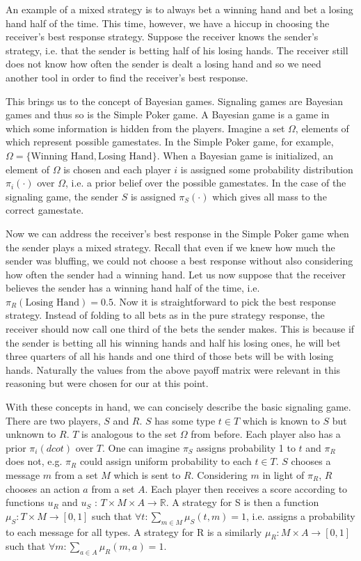 \documentclass{article}
\begin{document}
An example of a mixed strategy is to always bet a winning hand and bet a losing hand half of the time. This time, however, we have a hiccup in choosing the receiver's best response strategy. Suppose the receiver knows the sender's strategy, i.e. that the sender is betting half of his losing hands. The receiver still does not know how often the sender is dealt a losing hand and so we need another tool in order to find the receiver's best response.

This brings us to the concept of Bayesian games. Signaling games are Bayesian games and thus so is the Simple Poker game. A Bayesian game is a game in which some information is hidden from the players. Imagine a set $\Omega$, elements of which represent possible gamestates. In the Simple Poker game, for example, $\Omega = \{\text{Winning Hand}, \text{Losing Hand}\}$. When a Bayesian game is initialized, an element of $\Omega$ is chosen and each player $i$ is assigned some probability distribution $\pi_{i}(\cdot)$ over $\Omega$, i.e. a prior belief over the possible gamestates. In the case of the signaling game, the sender $S$ is assigned $\pi_S(\cdot)$ which gives all mass to the correct gamestate.

Now we can address the receiver's best response in the Simple Poker game when the sender plays a mixed strategy. Recall that even if we knew how much the sender was bluffing, we could not choose a best response without also considering how often the sender had a winning hand. Let us now suppose that the receiver believes the sender has a winning hand half of the time, i.e. $\pi_R(\text{Losing Hand}) = 0.5$. Now it is straightforward to pick the best response strategy. Instead of folding to all bets as in the pure strategy response, the receiver should now call one third of the bets the sender makes. This is because if the sender is betting all his winning hands and half his losing ones, he will bet three quarters of all his hands and one third of those bets will be with losing hands. Naturally the values from the above payoff matrix were relevant in this reasoning but were chosen for our  at this point.

With these concepts in hand, we can concisely describe the basic signaling game. There are two players, $S$ and $R$. $S$ has some type $t \in T$ which is known to $S$ but unknown to $R$. $T$ is analogous to the set $\Omega$ from before. Each player also has a prior $ \pi_i(dcot)$ over $T$. One can imagine $\pi_{S}$ assigns probability 1 to $t$ and $\pi_{R}$ does not, e.g. $\pi_{R}$ could assign uniform probability to each $t \in T$. $S$ chooses a message $m$ from a set $M$ which is sent to $R$. Considering $m$ in light of $\pi_R$, $R$ chooses an action $a$ from a set $A$. Each player then receives a score according to functions $u_R$ and $u_S$ : $T \times M \times A \to \mathbb{R}$.
A strategy for S is then a function $\mu_{S}: T \times M \to [0,1]$ such that $\forall t: \sum_{m \in M} \mu_{S}(t, m) = 1$, i.e. assigns a probability to each message for all types. A strategy for R is a similarly $\mu_{R} : M \times A \to [0,1]$ such that $\forall m: \sum_{a \in A} \mu_{R}(m,a) = 1$.
\end{document}
